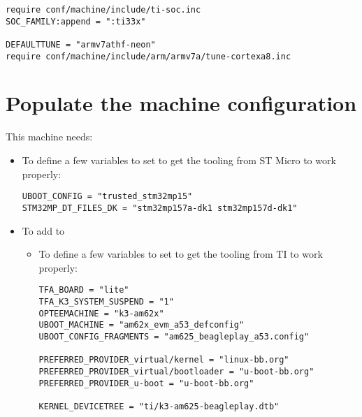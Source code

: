 \begin{verbatim}
require conf/machine/include/ti-soc.inc
SOC_FAMILY:append = ":ti33x"

DEFAULTTUNE = "armv7athf-neon"
require conf/machine/include/arm/armv7a/tune-cortexa8.inc
\end{verbatim}
  \fi
\fi
\section{Populate the machine configuration}

This  machine needs:

\if{}
\begin{itemize}
  \item To define a few variables to set to get the tooling from ST
    Micro to work properly:
\begin{verbatim}
UBOOT_CONFIG = "trusted_stm32mp15"
STM32MP_DT_FILES_DK = "stm32mp157a-dk1 stm32mp157d-dk1"
\end{verbatim}
  \item To add  to 
\else
  \if{}
\begin{itemize}
  \item To define a few variables to set to get the tooling from TI
   to work properly:
\begin{verbatim}
TFA_BOARD = "lite"
TFA_K3_SYSTEM_SUSPEND = "1"
OPTEEMACHINE = "k3-am62x"
UBOOT_MACHINE = "am62x_evm_a53_defconfig"
UBOOT_CONFIG_FRAGMENTS = "am625_beagleplay_a53.config"

PREFERRED_PROVIDER_virtual/kernel = "linux-bb.org"
PREFERRED_PROVIDER_virtual/bootloader = "u-boot-bb.org"
PREFERRED_PROVIDER_u-boot = "u-boot-bb.org"

KERNEL_DEVICETREE = "ti/k3-am625-beagleplay.dtb"


\end{verbatim}
\end{itemize}
\end{itemize}
